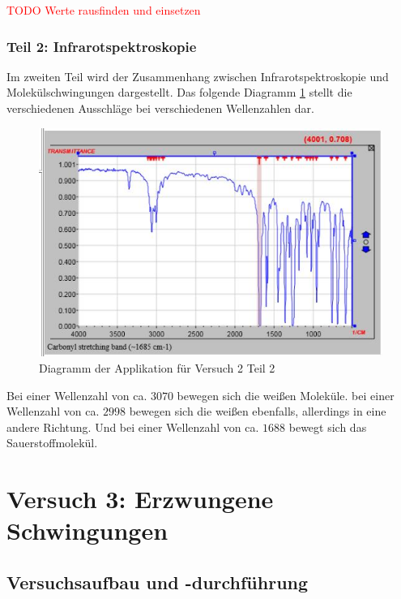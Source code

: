             \textcolor{red}{TODO Werte rausfinden und einsetzen}
        \subsubsection{Teil 2: Infrarotspektroskopie}
        
            Im zweiten Teil wird der Zusammenhang zwischen Infrarotspektroskopie und Molekülschwingungen dargestellt. Das folgende Diagramm \ref{fig:diagram_v2} stellt die verschiedenen Ausschläge bei verschiedenen Wellenzahlen dar.

            \begin{figure}[H]
                \centering
                \includegraphics[width=\textwidth]{bilder/diagram_v2.jpg}
                \caption{Diagramm der Applikation für Versuch 2 Teil 2}
                \label{fig:diagram_v2}
            \end{figure}

            Bei einer Wellenzahl von ca. $3070$ bewegen sich die weißen Moleküle. bei einer Wellenzahl von ca. $2998$ bewegen sich die weißen ebenfalls, allerdings in eine andere Richtung. Und bei einer Wellenzahl von ca. $1688$ bewegt sich das Sauerstoffmolekül.

\newpage

\section{Versuch 3: Erzwungene Schwingungen}

    \subsection{Versuchsaufbau und -durchführung}
            

